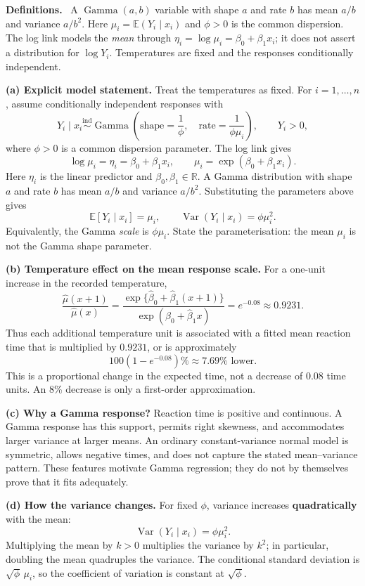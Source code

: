 \documentclass[11pt,a4paper]{article}
\newcommand{\given}{\mathrel{|}}
\newcommand{\E}{\mathbb{E}}
\newcommand{\studyheading}[1]{%
  \par\medskip\noindent\textcolor{statblue}{\textbf{#1.}}\ }
\begin{document}
\studyheading{Definitions}
A $\operatorname{Gamma}(a,b)$ variable with shape $a$ and rate $b$ has mean $a/b$ and variance $a/b^2$.
Here $\mu_i=\E(Y_i\given x_i)$ and $\phi>0$ is the common dispersion.
The log link models the \emph{mean} through $\eta_i=\log\mu_i=\beta_0+\beta_1x_i$; it does not assert a distribution for $\log Y_i$.
Temperatures are fixed and the responses conditionally independent.

\textbf{(a) Explicit model statement.}
Treat the temperatures as fixed. For $i=1,\ldots,n$, assume conditionally
independent responses with
\[
\boxed{
Y_i\given x_i\overset{\mathrm{ind}}{\sim}
\operatorname{Gamma}\!\left(
\text{shape}=\frac1\phi,\quad
\text{rate}=\frac1{\phi\mu_i}\right),\qquad Y_i>0,
}
\]
where $\phi>0$ is a common dispersion parameter. The log link gives
\[
\boxed{\log\mu_i=\eta_i=\beta_0+\beta_1x_i,
\qquad\mu_i=\exp(\beta_0+\beta_1x_i).}
\]
Here $\eta_i$ is the linear predictor and $\beta_0,\beta_1\in\mathbb R$.
A Gamma distribution with shape $a$ and rate $b$ has mean $a/b$ and
variance $a/b^2$. Substituting the parameters above gives
\[
\boxed{\E[Y_i\given x_i]=\mu_i,\qquad
\operatorname{Var}(Y_i\given x_i)=\phi\mu_i^2.}
\]
Equivalently, the Gamma \emph{scale} is $\phi\mu_i$. State the
parameterisation: the mean $\mu_i$ is not the Gamma shape parameter.

\textbf{(b) Temperature effect on the mean response scale.}
For a one-unit increase in the recorded temperature,
\[
\frac{\hat\mu(x+1)}{\hat\mu(x)}
=\frac{\exp\{\hat\beta_0+\hat\beta_1(x+1)\}}
       {\exp(\hat\beta_0+\hat\beta_1x)}
=e^{-0.08}\approx0.9231.
\]
Thus each additional temperature unit is associated with a fitted mean
reaction time that is multiplied by $0.9231$, or is approximately
\[
\boxed{100(1-e^{-0.08})\%\approx7.69\%\text{ lower}.}
\]
This is a proportional change in the expected time, not a decrease of
$0.08$ time units. An 8\% decrease is only a first-order approximation.

\textbf{(c) Why a Gamma response?}
Reaction time is positive and continuous. A Gamma response has this
support, permits right skewness, and accommodates larger variance at
larger means. An ordinary constant-variance normal model is symmetric,
allows negative times, and does not capture the stated mean--variance
pattern. These features motivate Gamma regression; they do not by
themselves prove that it fits adequately.

\textbf{(d) How the variance changes.}
For fixed $\phi$, variance increases \textbf{quadratically} with the mean:
\[
\operatorname{Var}(Y_i\given x_i)=\phi\mu_i^2.
\]
Multiplying the mean by $k>0$ multiplies the variance by $k^2$; in
particular, doubling the mean quadruples the variance. The conditional
standard deviation is $\sqrt\phi\,\mu_i$, so the coefficient of variation
is constant at $\sqrt\phi$.
\end{document}
